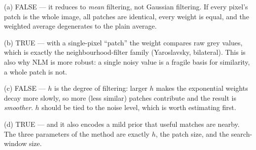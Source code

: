 \documentclass[11pt]{exam}
\newcommand{\TFT}{\ifprintanswers\textbf{TRUE}\hspace{1.1em}False\else True\hspace{1.1em}False\fi}
\newcommand{\TFF}{True\hspace{1.1em}\ifprintanswers\textbf{FALSE}\else False\fi}
\begin{document}
\begin{questions}

\begin{solution}
  (a) FALSE --- it reduces to \emph{mean} filtering, not Gaussian filtering. If every pixel's patch
  is the whole image, all patches are identical, every weight is equal, and the weighted average
  degenerates to the plain average.

  (b) TRUE --- with a single-pixel ``patch'' the weight compares raw grey values, which is exactly
  the neighbourhood-filter family (Yaroslavsky, bilateral). This is also why NLM is more robust:
  a single noisy value is a fragile basis for similarity, a whole patch is not.

  (c) FALSE --- $h$ is the degree of filtering: larger $h$ makes the exponential weights decay more
  slowly, so more (less similar) patches contribute and the result is \emph{smoother}. $h$ should
  be tied to the noise level, which is worth estimating first.

  (d) TRUE --- and it also encodes a mild prior that useful matches are nearby. The three
  parameters of the method are exactly $h$, the patch size, and the search-window size.
\end{solution}


\end{questions}
\end{document}
